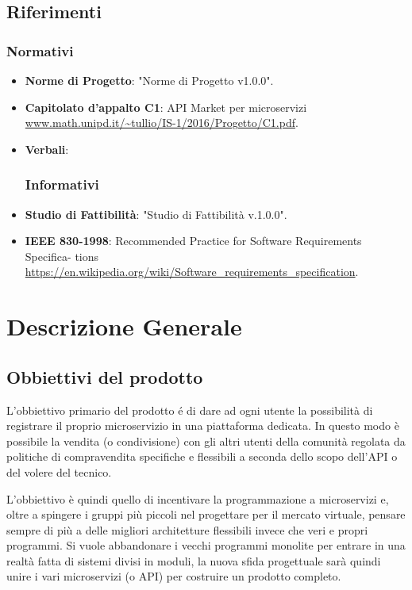 \documentclass[12pt,a4paper,titlepage]{article}
\begin{document}
\subsection{Riferimenti}
\subsubsection{Normativi}
\begin{itemize}
\item \textbf{Norme di Progetto}:	"Norme di Progetto v1.0.0".
\item \textbf{Capitolato d'appalto C1}:	API Market per microservizi \\
\textcolor{blue}{\url{www.math.unipd.it/~tullio/IS-1/2016/Progetto/C1.pdf}}. 
\item \textbf{Verbali}:
\subsubsection{Informativi}
\item \textbf {Studio di Fattibilità}: "Studio di Fattibilità v.1.0.0".
\item \textbf{IEEE 830-1998}: Recommended Practice for Software Requirements Specifica- tions \\
\textcolor{blue}{\url{https://en.wikipedia.org/wiki/Software_requirements_specification}}.
\end{itemize}

\newpage

\section{Descrizione Generale}
\subsection{Obbiettivi del prodotto}
L'obbiettivo primario del prodotto é di dare ad ogni utente la possibilità di registrare il proprio microservizio in una piattaforma dedicata. In questo modo è possibile la vendita (o condivisione) con gli altri utenti della comunità regolata da politiche di compravendita specifiche e flessibili a seconda dello scopo dell'API o del volere del tecnico. 

L'obbiettivo è quindi quello di incentivare la programmazione a microservizi e, oltre a spingere i gruppi più piccoli nel progettare per il mercato virtuale, pensare sempre di più a delle migliori architetture flessibili invece che veri e propri programmi. Si vuole abbandonare i vecchi programmi monolite per entrare in una realtà fatta di sistemi divisi in moduli, la nuova sfida progettuale sarà quindi unire i vari microservizi (o API) per costruire un prodotto completo.
\end{document}
